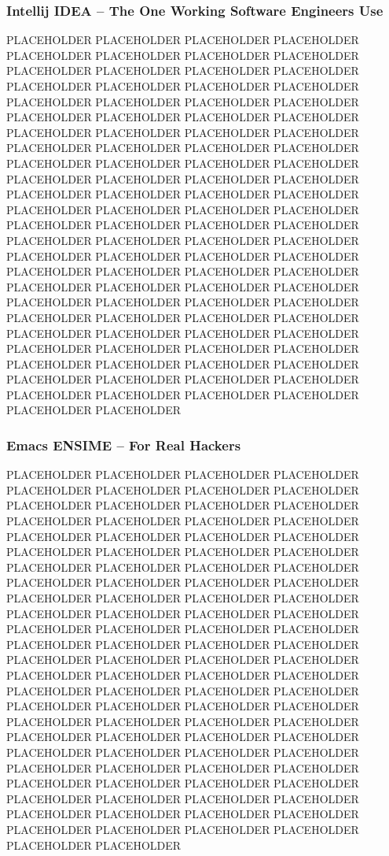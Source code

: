\subsubsection{Intellij IDEA -- The One Working Software Engineers Use}

PLACEHOLDER PLACEHOLDER PLACEHOLDER PLACEHOLDER PLACEHOLDER PLACEHOLDER PLACEHOLDER PLACEHOLDER PLACEHOLDER PLACEHOLDER PLACEHOLDER PLACEHOLDER PLACEHOLDER PLACEHOLDER PLACEHOLDER PLACEHOLDER PLACEHOLDER PLACEHOLDER PLACEHOLDER PLACEHOLDER PLACEHOLDER PLACEHOLDER PLACEHOLDER PLACEHOLDER PLACEHOLDER PLACEHOLDER PLACEHOLDER PLACEHOLDER PLACEHOLDER PLACEHOLDER PLACEHOLDER PLACEHOLDER PLACEHOLDER PLACEHOLDER PLACEHOLDER PLACEHOLDER PLACEHOLDER PLACEHOLDER PLACEHOLDER PLACEHOLDER PLACEHOLDER PLACEHOLDER PLACEHOLDER PLACEHOLDER PLACEHOLDER PLACEHOLDER PLACEHOLDER PLACEHOLDER PLACEHOLDER PLACEHOLDER PLACEHOLDER PLACEHOLDER PLACEHOLDER PLACEHOLDER PLACEHOLDER PLACEHOLDER PLACEHOLDER PLACEHOLDER PLACEHOLDER PLACEHOLDER PLACEHOLDER PLACEHOLDER PLACEHOLDER PLACEHOLDER PLACEHOLDER PLACEHOLDER PLACEHOLDER PLACEHOLDER PLACEHOLDER PLACEHOLDER PLACEHOLDER PLACEHOLDER PLACEHOLDER PLACEHOLDER PLACEHOLDER PLACEHOLDER PLACEHOLDER PLACEHOLDER PLACEHOLDER PLACEHOLDER PLACEHOLDER PLACEHOLDER PLACEHOLDER PLACEHOLDER PLACEHOLDER PLACEHOLDER PLACEHOLDER PLACEHOLDER PLACEHOLDER PLACEHOLDER PLACEHOLDER PLACEHOLDER PLACEHOLDER PLACEHOLDER PLACEHOLDER PLACEHOLDER PLACEHOLDER PLACEHOLDER

\subsubsection{Emacs ENSIME -- For Real Hackers}

PLACEHOLDER PLACEHOLDER PLACEHOLDER PLACEHOLDER PLACEHOLDER PLACEHOLDER PLACEHOLDER PLACEHOLDER PLACEHOLDER PLACEHOLDER PLACEHOLDER PLACEHOLDER PLACEHOLDER PLACEHOLDER PLACEHOLDER PLACEHOLDER PLACEHOLDER PLACEHOLDER PLACEHOLDER PLACEHOLDER PLACEHOLDER PLACEHOLDER PLACEHOLDER PLACEHOLDER PLACEHOLDER PLACEHOLDER PLACEHOLDER PLACEHOLDER PLACEHOLDER PLACEHOLDER PLACEHOLDER PLACEHOLDER PLACEHOLDER PLACEHOLDER PLACEHOLDER PLACEHOLDER PLACEHOLDER PLACEHOLDER PLACEHOLDER PLACEHOLDER PLACEHOLDER PLACEHOLDER PLACEHOLDER PLACEHOLDER PLACEHOLDER PLACEHOLDER PLACEHOLDER PLACEHOLDER PLACEHOLDER PLACEHOLDER PLACEHOLDER PLACEHOLDER PLACEHOLDER PLACEHOLDER PLACEHOLDER PLACEHOLDER PLACEHOLDER PLACEHOLDER PLACEHOLDER PLACEHOLDER PLACEHOLDER PLACEHOLDER PLACEHOLDER PLACEHOLDER PLACEHOLDER PLACEHOLDER PLACEHOLDER PLACEHOLDER PLACEHOLDER PLACEHOLDER PLACEHOLDER PLACEHOLDER PLACEHOLDER PLACEHOLDER PLACEHOLDER PLACEHOLDER PLACEHOLDER PLACEHOLDER PLACEHOLDER PLACEHOLDER PLACEHOLDER PLACEHOLDER PLACEHOLDER PLACEHOLDER PLACEHOLDER PLACEHOLDER PLACEHOLDER PLACEHOLDER PLACEHOLDER PLACEHOLDER PLACEHOLDER PLACEHOLDER PLACEHOLDER PLACEHOLDER PLACEHOLDER PLACEHOLDER PLACEHOLDER PLACEHOLDER


